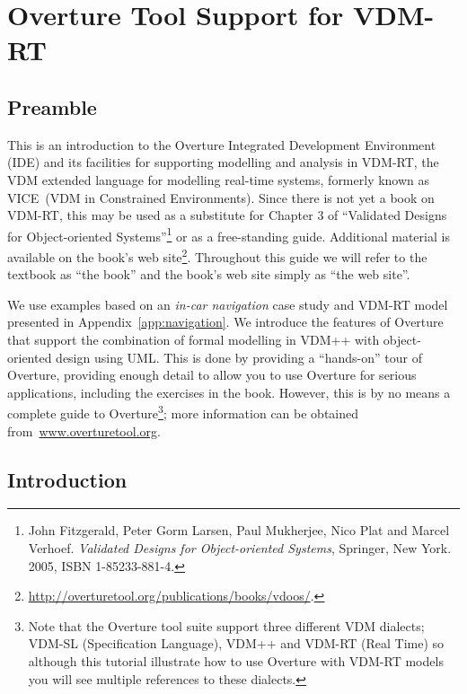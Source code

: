 \chapter{Overture Tool Support for VDM-RT}
\label{cha:toolbox}
\initexercise

\section*{Preamble}

This is an introduction to the Overture Integrated Development
Environment (IDE) and its facilities for supporting modelling and
analysis in VDM-RT, the VDM extended language for modelling real-time
systems, formerly known as VICE~(VDM in Constrained Environments). 
Since there is not yet a book on VDM-RT, this
may be used as a substitute for Chapter 3 of ``Validated Designs for
Object-oriented Systems''\footnote{John Fitzgerald, Peter Gorm Larsen,
  Paul Mukherjee, Nico Plat and Marcel Verhoef. \emph{Validated
    Designs for Object-oriented Systems}, Springer, New York. 2005,
  ISBN 1-85233-881-4.} or as a free-standing guide. Additional material
is available on the book's web
site\footnote{\url{http://overturetool.org/publications/books/vdoos/}.}. Throughout this guide we will refer to
the textbook as ``the book'' and the book's web site simply as ``the
web site''.

We use examples based on an \emph{in-car navigation} case study and
VDM-RT model presented in Appendix~\ref{app:navigation}. We introduce the features of Overture that support the combination of
formal modelling in VDM++ with object-oriented design using UML. This
is done by providing a ``hands-on'' tour of Overture, providing enough
detail to allow you to use Overture for serious applications,
including the exercises in the book. However, this is by no means a
complete guide to Overture\footnote{Note that the Overture tool suite support three
  different VDM dialects; VDM-SL (Specification Language), VDM++ and
  VDM-RT (Real Time) so although this tutorial illustrate how to use
  Overture with VDM-RT models you will see multiple references to
  these dialects.}; more information can be obtained
from~\url{www.overturetool.org}.



\section{Introduction}

